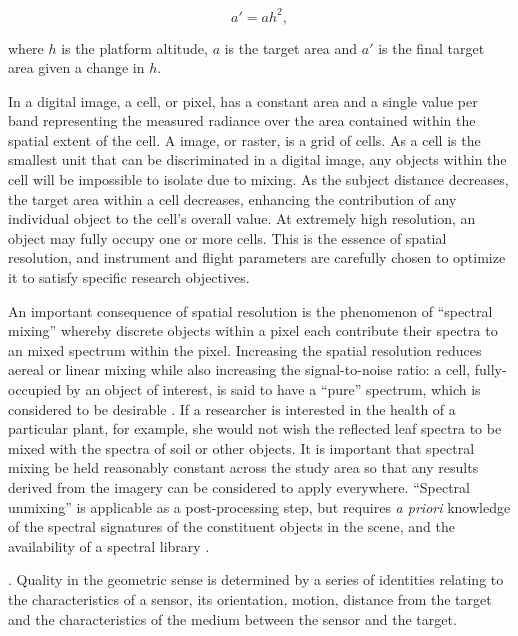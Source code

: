 \begin{equation}
a\prime = a h^2,
\end{equation}

where $h$ is the platform altitude, $a$ is the target area and $a\prime$ is the final target area given a change in $h$. 

In a digital image, a cell, or pixel, has a constant area and a single value per band representing the measured radiance over the area contained within the spatial extent of the cell. A image, or raster, is a grid of cells. As a cell is the smallest unit that can be discriminated in a digital image, any objects within the cell will be impossible to isolate due to mixing. As the subject distance decreases, the target area within a cell decreases, enhancing the contribution of any individual object to the cell's overall value. At extremely high resolution, an object may fully occupy one or more cells. This is the essence of spatial resolution, and instrument and flight parameters are carefully chosen to optimize it to satisfy specific research objectives. 

An important consequence of spatial resolution is the phenomenon of ``spectral mixing'' whereby discrete objects within a pixel each contribute their spectra to an mixed spectrum within the pixel. Increasing the spatial resolution reduces aereal or linear mixing \cite{Gupta2018} while also increasing the signal-to-noise ratio: a cell, fully-occupied by an object of interest, is said to have a ``pure'' spectrum, which is considered to be desirable \cite{Gupta2018}. If a researcher is interested in the health of a particular plant, for example, she would not wish the reflected leaf spectra to be mixed with the spectra of soil or other objects. It is important that spectral mixing be held reasonably constant across the study area so that any results derived from the imagery can be considered to apply everywhere. ``Spectral unmixing'' is applicable as a post-processing step, but requires \emph{a priori} knowledge of the spectral signatures of the constituent objects in the scene, and the availability of a spectral library \cite{Adams1986,Smith1990,Gupta2018}.






 \cite{Gupta2018}. 
Quality in the geometric sense is determined by a series of identities relating to the characteristics of a sensor, its orientation, motion, distance from the target and the characteristics of the medium between the sensor and the target.

